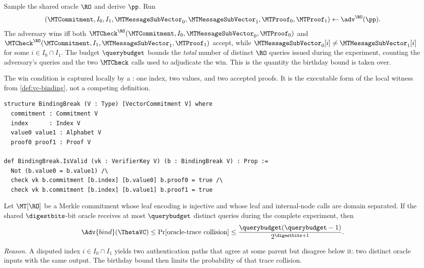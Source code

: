 \begin{experiment}\label{exp:binding}
Sample the shared oracle $\RO$ and derive $\pp$.  Run
\[
  (\MTCommitment,I_0,I_1,\MTMessageSubVector_0,\MTMessageSubVector_1,
    \MTProof_0,\MTProof_1)
  \leftarrow\adv^\RO(\pp).
\]
The adversary wins iff both
$\MTCheck^\RO(\MTCommitment,I_0,\MTMessageSubVector_0,\MTProof_0)$ and
$\MTCheck^\RO(\MTCommitment,I_1,\MTMessageSubVector_1,\MTProof_1)$ accept,
while $\MTMessageSubVector_0[i]\ne\MTMessageSubVector_1[i]$ for some
$i\in I_0\cap I_1$.
The budget $\querybudget$ bounds the \emph{total} number of distinct $\RO$
queries issued during the experiment, counting the adversary's queries and
the two $\MTCheck$ calls used to adjudicate the win.  This is the quantity the
birthday bound is taken over.
\end{experiment}

The win condition is captured locally by a : one index, two
values, and two accepted proofs.  It is the executable form of the local
witness from \cref{def:vc-binding}, not a competing definition.
\begin{verbatim}
structure BindingBreak (V : Type) [VectorCommitment V] where
  commitment : Commitment V
  index      : Index V
  value0 value1 : Alphabet V
  proof0 proof1 : Proof V

def BindingBreak.IsValid (vk : VerifierKey V) (b : BindingBreak V) : Prop :=
  Not (b.value0 = b.value1) /\
  check vk b.commitment [b.index] [b.value0] b.proof0 = true /\
  check vk b.commitment [b.index] [b.value1] b.proof1 = true
\end{verbatim}

\begin{proposition}[Binding from collision resistance]\label{thm:binding-cr}
Let $\MT[\RO]$ be a Merkle commitment whose leaf encoding is injective and
whose leaf and internal-node calls are domain separated.  If the shared
$\digestbits$-bit oracle receives at most $\querybudget$ distinct queries
during the complete experiment, then
\[
  \Adv{bind}(\ThetaVC)
  \le
  \Pr[\text{oracle-trace collision}]
  \le
  \frac{\querybudget(\querybudget-1)}{2^{\digestbits+1}}.
\]
\end{proposition}

\noindent\emph{Reason.}
A disputed index $i\in I_0\cap I_1$ yields two authentication paths that
agree at some parent but disagree below it: two distinct oracle inputs with
the same output.  The birthday bound then limits the probability of that trace
collision.

